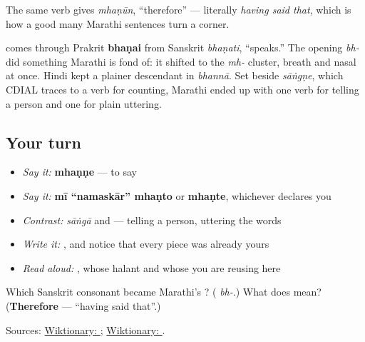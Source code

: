 The same verb gives \textbf{} \emph{mhaṇūn}, \textquotedblleft{}therefore\textquotedblright{} — literally \emph{having said that}, which is how a good many Marathi sentences turn a corner.

\begin{cousinweb}
\textbf{} comes through Prakrit \textbf{bhaṇai} from Sanskrit \textbf{} \emph{bhaṇati}, \textquotedblleft{}speaks.\textquotedblright{} The opening \textbf{} \emph{bh-} did something Marathi is fond of: it shifted to the \textbf{} \emph{mh-} cluster, breath and nasal at once. Hindi kept a plainer descendant in \emph{bhannā}. Set beside \emph{sāṅgṇe}, which CDIAL traces to a verb for counting, Marathi ended up with one verb for telling a person and one for plain uttering.
\end{cousinweb}

\subsection*{Your turn}
\begin{itemize}
\raggedright
  \item \emph{Say it:} \textbf{mhaṇṇe} — to say
  \item \emph{Say it:} \textbf{mī \textquotedblleft{}namaskār\textquotedblright{} mhaṇto} or \textbf{mhaṇte}, whichever declares you
  \item \emph{Contrast:} \emph{sāṅgā} and \textbf{} — telling a person, uttering the words
  \item \emph{Write it:} \textbf{}, and notice that every piece was already yours
  \item \emph{Read aloud:} \textbf{}, whose halant and whose \textbf{} you are reusing here
\end{itemize}

\begin{tcolorbox}[breakable,colback=teal!4,colframe=teal!35!black,title={Before you move on}]
Which Sanskrit consonant became Marathi's \textbf{}? (\textbf{} \emph{bh-}.) What does \textbf{} mean? (\textbf{Therefore} — \textquotedblleft{}having said that\textquotedblright{}.)

Sources: \href{https://en.wiktionary.org/wiki/\%E0\%A4\%AE\%E0\%A5\%8D\%E0\%A4\%B9\%E0\%A4\%A3\%E0\%A4\%A3\%E0\%A5\%87}{Wiktionary: }; \href{https://en.wiktionary.org/wiki/\%E0\%A4\%AD\%E0\%A4\%A3\%E0\%A4\%A4\%E0\%A4\%BF}{Wiktionary: }.
\end{tcolorbox}
